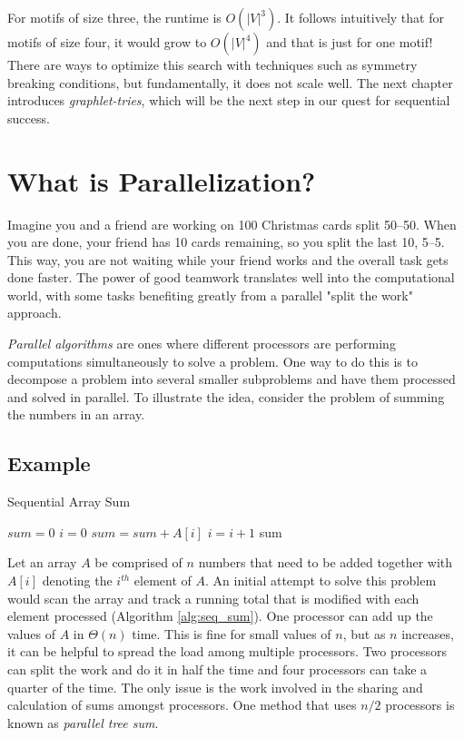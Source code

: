 \documentclass[12pt,twoside]{reedthesis}
\begin{document}
For motifs of size three, the runtime is $O(|V|^3)$. It follows intuitively that for motifs of size four, it would grow to $O(|V|^4)$ and that is just for one motif! There are ways to optimize this search with techniques such as symmetry breaking conditions, but fundamentally, it does not scale well.  The next chapter introduces \textit{graphlet-tries}, which will be the next step in our quest for sequential success.

\section{What is Parallelization?} \label{sec:pre_para}
Imagine you and a friend are working on 100 Christmas cards split 50--50. When you are done, your friend has 10 cards remaining, so you split the last 10, 5--5. This way, you are not waiting while your friend works and the overall task gets done faster. The power of good teamwork translates well into the computational world, with some tasks benefiting greatly from a parallel "split the work" approach. 

\textit{Parallel algorithms} are ones where different processors are performing computations simultaneously to solve a problem. One way to do this is to decompose a problem into several smaller subproblems and have them processed and solved in parallel. To illustrate the idea, consider the problem of summing the numbers in an array.

\subsection{Example}
\begin{algorithm}
\caption{Sequential Array Sum}
\label{alg:seq_sum}
\begin{algorithmic}[1]

    \State $sum = 0$
    \State $i = 0$
    	\State $sum = sum + A[i]$
	\State $i = i + 1$
    \EndWhile
    \State \Return sum
\EndFunction

\end{algorithmic}
\end{algorithm}

Let an array $A$ be comprised of $n$ numbers that need to be added together with $A[i]$ denoting the $i^{th}$ element of $A$. An initial attempt to solve this problem would scan the array and track a running total that is modified with each element processed (Algorithm \ref{alg:seq_sum}). One processor can add up the values of $A$ in $\Theta (n)$ time. This is fine for small values of $n$, but as $n$ increases, it can be helpful to spread the load among multiple processors. Two processors can split the work and do it  in half the time and four processors can take a quarter of the time. The only issue is the work involved in the sharing and calculation of sums amongst processors. One method that uses $n/2$ processors is known as \textit{parallel tree sum}.
\end{document}
